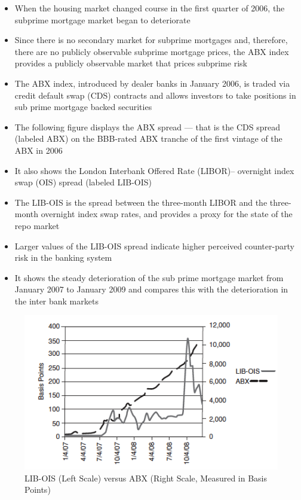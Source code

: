 \documentclass[11pt]{beamer}
\begin{document}
\begin{frame}
\begin{itemize}
\item When the housing market changed course in the first quarter of 2006, the subprime mortgage market began to deteriorate
\item  Since there is no secondary market for subprime mortgages and, therefore, there are no publicly observable subprime mortgage prices, the ABX index provides a publicly observable market that prices subprime risk
\item  The ABX index, introduced by dealer banks in January 2006, is traded via credit default swap (CDS) contracts and allows investors to take positions in sub prime mortgage backed securities
\end{itemize}
\end{frame}

\begin{frame}
\begin{itemize}
\item The following figure displays the ABX spread — that is the CDS
spread (labeled ABX) on the BBB-rated ABX tranche of the first vintage
of the ABX in 2006
\item It also shows the London Interbank Offered Rate (LIBOR)– overnight index swap (OIS) spread (labeled LIB-OIS)
\item The LIB-OIS is the spread between the three-month LIBOR and the three-month overnight index swap rates, and provides a proxy for the state of the repo market
\item Larger values of the LIB-OIS spread indicate higher perceived counter-party risk in the banking system
\item It shows the steady deterioration of the sub prime mortgage market from January 2007 to January 2009 and compares this with the deterioration in the inter bank markets
\end{itemize}
\end{frame}

\begin{frame}
\begin{figure}
\includegraphics[width=\textwidth]{11_9.png}
\caption{LIB-OIS (Left Scale) versus ABX (Right Scale, Measured in
Basis Points)}
\end{figure}
\end{frame}
\end{document}
